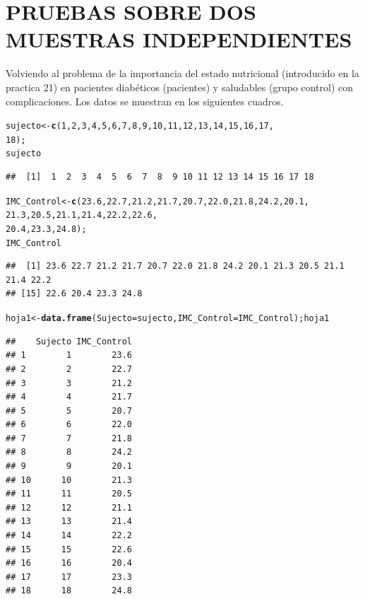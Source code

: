 \documentclass[12pt,letterpaper]{article}\usepackage[]{graphicx}\usepackage[]{color}
\makeatletter
\newcommand{\hlnum}[1]{\textcolor[rgb]{0.686,0.059,0.569}{#1}}%
\newcommand{\hlstd}[1]{\textcolor[rgb]{0.345,0.345,0.345}{#1}}%
\newcommand{\hlkwb}[1]{\textcolor[rgb]{0.69,0.353,0.396}{#1}}%
\newcommand{\hlkwc}[1]{\textcolor[rgb]{0.333,0.667,0.333}{#1}}%
\newcommand{\hlkwd}[1]{\textcolor[rgb]{0.737,0.353,0.396}{\textbf{#1}}}%
\newenvironment{kframe}{%
 \def\at@end@of@kframe{}%
 \ifinner\ifhmode%
  \def\at@end@of@kframe{\end{minipage}}%
  \begin{minipage}{\columnwidth}%
 \fi\fi%
 \def\FrameCommand##1{\hskip\@totalleftmargin \hskip-\fboxsep
 \colorbox{shadecolor}{##1}\hskip-\fboxsep
     \hskip-\linewidth \hskip-\@totalleftmargin \hskip\columnwidth}%
 \MakeFramed {\advance\hsize-\width
   \@totalleftmargin\z@ \linewidth\hsize
   \@setminipage}}%
 {\par\unskip\endMakeFramed%
 \at@end@of@kframe}
\newenvironment{knitrout}{}{} %
\makeatother
\begin{document}
\section{PRUEBAS SOBRE DOS MUESTRAS INDEPENDIENTES}


Volviendo al problema de la importancia del estado nutricional (introducido en la practica 21) en pacientes diab\'eticos (pacientes) y saludables (grupo control) con complicaciones. Los datos se muestran en los siguientes cuadros.

\begin{knitrout}
\color{fgcolor}\begin{kframe}
\begin{alltt}
\hlstd{sujecto} \hlkwb{<-} \hlkwd{c}\hlstd{(}\hlnum{1}\hlstd{,} \hlnum{2}\hlstd{,} \hlnum{3}\hlstd{,} \hlnum{4}\hlstd{,} \hlnum{5}\hlstd{,} \hlnum{6}\hlstd{,} \hlnum{7}\hlstd{,} \hlnum{8}\hlstd{,} \hlnum{9}\hlstd{,} \hlnum{10}\hlstd{,} \hlnum{11}\hlstd{,} \hlnum{12}\hlstd{,} \hlnum{13}\hlstd{,} \hlnum{14}\hlstd{,} \hlnum{15}\hlstd{,} \hlnum{16}\hlstd{,} \hlnum{17}\hlstd{,}
                       \hlnum{18}\hlstd{);}
\hlstd{sujecto}
\end{alltt}
\begin{verbatim}
##  [1]  1  2  3  4  5  6  7  8  9 10 11 12 13 14 15 16 17 18
\end{verbatim}
\begin{alltt}
\hlstd{IMC_Control} \hlkwb{<-} \hlkwd{c}\hlstd{(}\hlnum{23.6}\hlstd{,} \hlnum{22.7}\hlstd{,} \hlnum{21.2}\hlstd{,} \hlnum{21.7}\hlstd{,} \hlnum{20.7}\hlstd{,} \hlnum{22.0}\hlstd{,} \hlnum{21.8}\hlstd{,} \hlnum{24.2}\hlstd{,} \hlnum{20.1}\hlstd{,}
                 \hlnum{21.3}\hlstd{,} \hlnum{20.5}\hlstd{,} \hlnum{21.1}\hlstd{,} \hlnum{21.4}\hlstd{,} \hlnum{22.2}\hlstd{,} \hlnum{22.6}\hlstd{,}
                 \hlnum{20.4}\hlstd{,} \hlnum{23.3}\hlstd{,} \hlnum{24.8}\hlstd{);}
\hlstd{IMC_Control}
\end{alltt}
\begin{verbatim}
##  [1] 23.6 22.7 21.2 21.7 20.7 22.0 21.8 24.2 20.1 21.3 20.5 21.1 21.4 22.2
## [15] 22.6 20.4 23.3 24.8
\end{verbatim}
\begin{alltt}
\hlstd{hoja1} \hlkwb{<-} \hlkwd{data.frame}\hlstd{(}\hlkwc{Sujecto}\hlstd{=sujecto,} \hlkwc{IMC_Control}\hlstd{=IMC_Control); hoja1}
\end{alltt}
\begin{verbatim}
##    Sujecto IMC_Control
## 1        1        23.6
## 2        2        22.7
## 3        3        21.2
## 4        4        21.7
## 5        5        20.7
## 6        6        22.0
## 7        7        21.8
## 8        8        24.2
## 9        9        20.1
## 10      10        21.3
## 11      11        20.5
## 12      12        21.1
## 13      13        21.4
## 14      14        22.2
## 15      15        22.6
## 16      16        20.4
## 17      17        23.3
## 18      18        24.8
\end{verbatim}
\end{kframe}
\end{knitrout}
\end{document}
